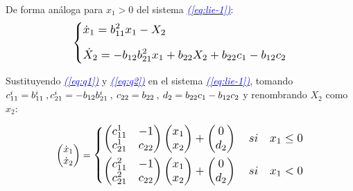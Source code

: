 \documentclass[12pt,a4paper]{report} %
\newcommand{\eref}[1]{\hyperref[#1]{\textcolor{blue}{\textit{(\ref*{#1})}}}}
\begin{document}
	
	\vspace{0.5cm}\noindent De forma análoga para $x_1>0$ del sistema \eref{eq:lie-1}:
	\begin{equation}
		\label{eq:q2}
		\scalebox{1.2}{$\displaystyle
			\left\{
			\begin{aligned}
			&\dot{x}_1=b_{11}^2x_1-X_2 \\[2mm]
			&\dot{X}_2=-b_{12}b_{21}^2x_1+b_{22}X_2+b_{22}c_1-b_{12}c_2
		\end{aligned}
		\right.
		$}
	\end{equation}\smallskip
	
	\vspace{0.5cm}\noindent Sustituyendo \eref{eq:q1} y \eref{eq:q2} en el sistema \eref{eq:lie-1}, tomando $c_{11}^i=b_{11}^i \: , \: \\c_{21}^i=-b_{12}b_{21}^i \: , \: c_{22}=b_{22} \: , \: d_2=b_{22}c_1-b_{12}c_2$ y renombrando $X_2$ como $x_2$:
	
	\begin{equation}
		\begin{pmatrix*}[r]
			\dot{x}_1 \\ \dot{x}_2
		\end{pmatrix*}=
		\label{eq:lie-12}
		\scalebox{1.2}{$\displaystyle
			\left\{
			\begin{aligned}
				\begin{pmatrix*}[r]
					c_{11}^1 & -1 \\
					c_{21}^1 & c_{22}
				\end{pmatrix*}\begin{pmatrix*}[r]
				x_1\\x_2
				\end{pmatrix*}+\begin{pmatrix*}[c]
				0 \\ d_2
				\end{pmatrix*} \quad si \quad x_1 \leq 0 \\
				\begin{pmatrix*}[r]
					c_{11}^2 & -1 \\
					c_{21}^2 & c_{22}
				\end{pmatrix*}\begin{pmatrix*}[r]
				x_1\\x_2
				\end{pmatrix*}+\begin{pmatrix*}[c]
				0 \\ d_2
				\end{pmatrix*} \quad si \quad x_1 < 0
			\end{aligned}
			\right.
			$} 
	\end{equation}\smallskip
	
\end{document}
